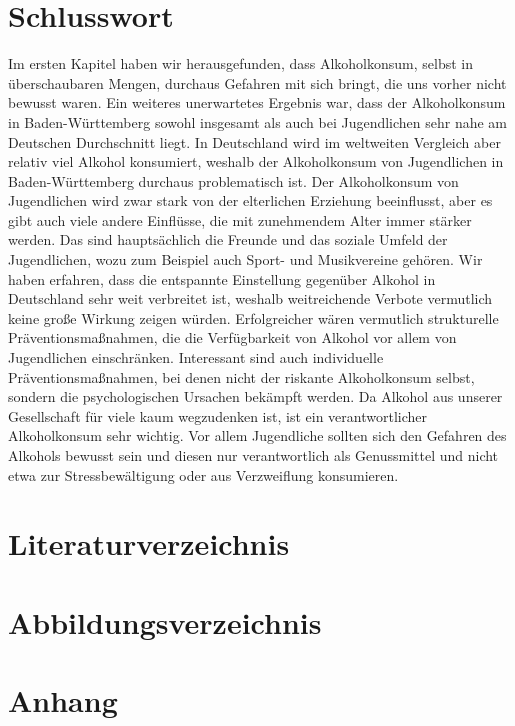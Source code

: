\documentclass[12pt]{article}
\begin{document}
\section{Schlusswort}
Im ersten Kapitel haben wir herausgefunden, dass Alkoholkonsum, selbst in überschaubaren Mengen, durchaus Gefahren mit sich bringt, die uns vorher nicht bewusst waren. Ein weiteres unerwartetes Ergebnis war, dass der Alkoholkonsum in Baden-Württemberg sowohl insgesamt als auch bei Jugendlichen sehr nahe am Deutschen Durchschnitt liegt. In Deutschland wird im weltweiten Vergleich aber relativ viel Alkohol konsumiert, weshalb der Alkoholkonsum von Jugendlichen in Baden-Württemberg durchaus problematisch ist. Der Alkoholkonsum von Jugendlichen wird zwar stark von der elterlichen Erziehung beeinflusst, aber es gibt auch viele andere Einflüsse, die mit zunehmendem Alter immer stärker werden. Das sind hauptsächlich die Freunde und das soziale Umfeld der Jugendlichen, wozu zum Beispiel auch Sport- und Musikvereine gehören. Wir haben erfahren, dass die entspannte Einstellung gegenüber Alkohol in Deutschland sehr weit verbreitet ist, weshalb weitreichende Verbote vermutlich keine große Wirkung zeigen würden. Erfolgreicher wären vermutlich strukturelle Präventionsmaßnahmen, die die Verfügbarkeit von Alkohol vor allem von Jugendlichen einschränken. Interessant sind auch individuelle Präventionsmaßnahmen, bei denen nicht der riskante Alkoholkonsum selbst, sondern die psychologischen Ursachen bekämpft werden. Da Alkohol aus unserer Gesellschaft für viele kaum wegzudenken ist, ist ein verantwortlicher Alkoholkonsum sehr wichtig. Vor allem Jugendliche sollten sich den Gefahren des Alkohols bewusst sein und diesen nur verantwortlich als Genussmittel und nicht etwa zur Stressbewältigung oder aus Verzweiflung konsumieren.






\clearpage

\section{Literaturverzeichnis}
\printbibliography[heading=none]
\section{Abbildungsverzeichnis}
\makeatletter{}\makeatother
\lofwithouttitle
\section{Anhang}


\end{document}
